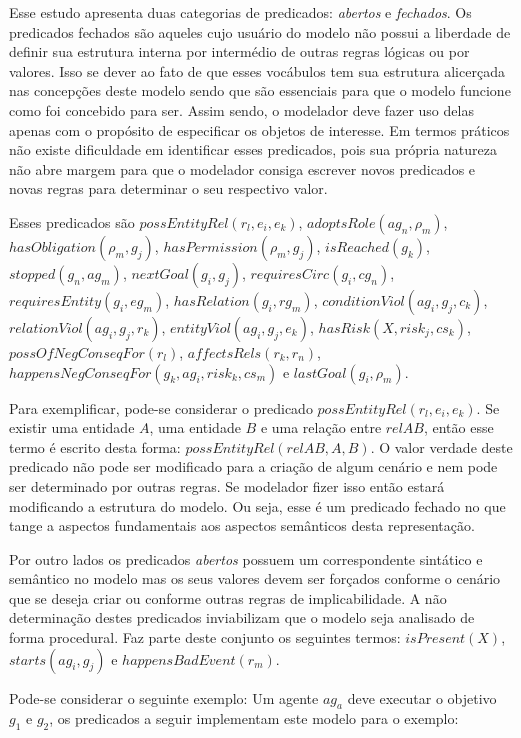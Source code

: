 Esse estudo apresenta duas categorias de predicados: \textit{abertos} e \textit{fechados}. Os predicados fechados são aqueles cujo usuário do modelo não possui a liberdade de definir sua estrutura interna por intermédio de outras regras lógicas ou por valores. Isso se dever ao fato de que esses vocábulos tem sua estrutura alicerçada nas concepções deste modelo sendo que são essenciais para que o modelo funcione como foi concebido para ser. Assim sendo, o modelador deve fazer uso delas apenas com o propósito de especificar os objetos de interesse. Em termos práticos não existe dificuldade em identificar esses predicados, pois sua própria natureza não abre margem para que o modelador consiga escrever novos predicados e novas regras para determinar o seu respectivo valor. 

Esses predicados são $possEntityRel(r_l,e_i,e_k)$, $adoptsRole(ag_n,\rho_m)$, $hasObligation(\rho_m,g_j)$,
$hasPermission(\rho_m, g_j)$, $isReached(g_k)$, $stopped(g_n, ag_m)$, $nextGoal(g_i,g_j)$, $requiresCirc(g_i,cg_n)$,
$requiresEntity(g_i,eg_m)$, $hasRelation(g_i,rg_m)$, $conditionViol(ag_i,g_j,c_k) $, $ relationViol(ag_i,g_j,r_k) $,
$ entityViol(ag_i,g_j,e_k) $,  $ hasRisk(X, risk_j, cs_k) $, $possOfNegConseqFor(r_l)$, 
$affectsRels(r_k,r_n)$, $happensNegConseqFor(g_k, ag_i,risk_k,cs_m)$  e $lastGoal(g_i,\rho_m)$. 


Para exemplificar, pode-se considerar o predicado $possEntityRel(r_l,e_i,e_k)$. Se existir uma entidade $A$, uma entidade $B$ e uma relação entre $relAB$, então esse termo é escrito desta forma: $possEntityRel(relAB,A,B)$. O valor verdade deste predicado não pode ser modificado para a criação de algum cenário e nem pode ser determinado por outras regras. Se modelador fizer isso então estará modificando a estrutura do modelo. Ou seja, esse é um predicado fechado no que tange a aspectos fundamentais aos aspectos semânticos desta representação. 

Por outro lados os predicados \textit{abertos} possuem um correspondente sintático e semântico no modelo mas os seus valores devem ser forçados conforme o cenário que se deseja criar ou conforme outras regras de implicabilidade. A não determinação destes predicados inviabilizam que o modelo seja analisado de forma procedural. Faz parte deste conjunto os seguintes termos: $isPresent(X)$,$starts(ag_i,g_j)$ e $happensBadEvent(r_m)$.

Pode-se considerar o seguinte exemplo: Um agente $ag_a$ deve executar o objetivo $g_1$ e $g_2$, os predicados a seguir implementam este modelo para o exemplo:

